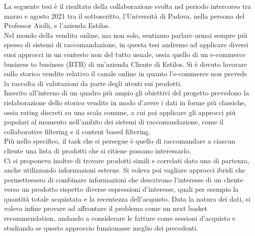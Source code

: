 
La seguente tesi è il risultato della collaborazione svolta nel periodo intercorso tra marzo e agosto 2021 tra il sottoscritto, l'Università di Padova, nella persona del Professor Aiolli, e l'azienda Estilos.\\
Nel mondo della vendita online, ma non solo, sentiamo parlare ormai sempre più spesso di sistemi di raccomandazione, in questa tesi andremo ad applicare diversi suoi approcci in un contesto non del tutto usuale, ossia quello di un e-commerce business to business (BTB) di un'azienda Cliente di Estilos. 
Si è dovuto lavorare sullo storico vendite relativo il canale online in quanto l'e-commerce non prevede la raccolta di valutazioni da parte degli utenti sui prodotti.\\
Inserito all'interno di un quadro più ampio gli obiettivi del progetto prevedono la rielaborazione dello storico vendite in modo d'avere i dati in forme più classiche, ossia rating discreti su una scala comune, a cui poi applicare gli approcci più popolari al momento nell'ambito dei sistemi di raccomandazione, come il collaborative filtering e il content based filtering.\\
Più nello specifico, il task che si persegue è quello di raccomandare a ciascun cliente una lista di prodotti che si ritiene possano interessarlo.\\
Ci si proponeva inoltre di trovare prodotti simili e correlati dato uno di partenza, anche utilizzando informazioni esterne. Si voleva poi vagliare approcci ibridi che permettessero di combinare informazioni che descrivono l'interesse di un cliente verso un prodotto rispetto diverse espressioni d'interesse, quali per esempio la quantità totale acquistata e la recentezza dell'acquisto. Data la natura dei dati, si voleva infine provare ad affrontare il problema come un next basket recommendation, andando a considerare le fatture come sessioni d'acquisto e studiando se questo approccio funzionasse meglio dei precedenti.